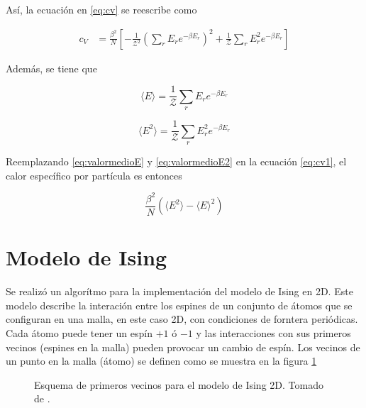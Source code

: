 \documentclass[a4paper,12pt]{article}
\begin{document}
  \noindent Así, la ecuación en \ref{eq:cv} se reescribe como

  \begin{align}
    c_{V}  &= \frac{\beta ^2}{N} \left[ -\frac{1}{\mathcal{Z}^2}\left( \sum_{r} E_{r} e^{-\beta E_{r}}\right)^2 +  \frac{1}{\mathcal{Z}}  \sum_{r} E_{r}^2 e^{-\beta E_{r}}  \right]
             \label{eq:cv1}
\end{align}

\noindent Además, se tiene que

\begin{equation}
  \langle E \rangle = \frac{1}{\mathcal{Z}} \sum_{r} E_{r} e^{-\beta E_{r}}
  \label{eq:valormedioE}
\end{equation}

\begin{equation}
  \langle E^2 \rangle = \frac{1}{\mathcal{Z}} \sum_{r} E_{r}^2 e^{-\beta E_{r}}
  \label{eq:valormedioE2}
  \end{equation}

  \noindent Reemplazando \ref{eq:valormedioE} y \ref{eq:valormedioE2} en la ecuación \ref{eq:cv1}, el calor específico por partícula es entonces

  \begin{equation}
    \frac{\beta ^2}{N} \left( \langle E^2 \rangle - \langle E \rangle ^2 \right)
    \label{eq:cvfinal}
  \end{equation}
  
  
   \section{Modelo de Ising}

   \noindent Se realizó un algorítmo para la implementación del modelo de Ising en 2D. Este modelo describe la interación entre los espines de un conjunto de átomos que se configuran en una malla, en este caso 2D, con condiciones de forntera periódicas. Cada átomo puede tener un espín $+1$ ó $-1$ y las interacciones con sus primeros vecinos (espines en la malla) pueden provocar un cambio de espín. Los vecinos de un punto en la malla (átomo) se definen como se muestra en la figura \ref{fig:vecinos}

    \begin{figure}[H]
     \centering
     \caption{Esquema de primeros vecinos para el modelo de Ising 2D. Tomado de \cite{krauth2006}.}
     \label{fig:vecinos}
   \end{figure}
\end{document}

